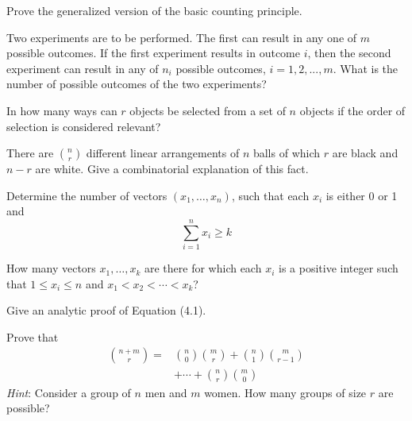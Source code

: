 \documentclass[12pt]{article}
\newenvironment{problem}[2][Problem]{\begin{trivlist}
\item[\hskip \labelsep {\bfseries #1}\hskip \labelsep {\bfseries #2.}]}{\end{trivlist}}
\begin{document}
\newpage
\begin{problem}{1.T.1}
Prove the generalized version of the basic counting principle.
\end{problem}


\begin{problem}{1.T.2}
Two experiments are to be performed. The first can result in any one of $m$ possible outcomes. If the first experiment results in outcome $i$, then the second experiment can result in any of $n_i$ possible outcomes, $i = 1,2,...,m$. What is the number of possible outcomes of the two experiments?
\end{problem}


\begin{problem}{  1.T.3 }
In how many ways can $r$ objects be selected from a set of $n$ objects if the order of selection is considered relevant?
\end{problem}


\begin{problem}{ 1.T.4 }
There are ${n \choose r}$ different linear arrangements of $n$ balls of which $r$ are black and $n-r$ are white. Give a combinatorial explanation of this fact.
\end{problem}


\begin{problem}{  1.T.5 }
Determine the number of vectors $\left(x_1,\ldots,x_n\right)$, such that each $x_i$ is either 0 or 1 and \[ \sum_{i=1}^n x_i \geq k\]
\end{problem}


\begin{problem}{  1.T.6 }
How many vectors $x_1,\ldots,x_k$ are there for which each $x_i$ is a positive integer such that $1\leq x_i \leq n$ and $x_1 < x_2 < \cdots < x_k$?
\end{problem}



\begin{problem}{   1.T.7}
Give an analytic proof of Equation (4.1).
\end{problem}




\begin{problem}{  1.T.8 }
Prove that
\begin{equation}
\begin{split}
{n+m \choose r} = & {n\choose 0}{m \choose r} + {n \choose 1}{m\choose r-1} \\ 
& + \cdots + {n \choose r}{m \choose 0}
\end{split}
\end{equation}
\textit{Hint}: Consider a group of $n$ men and $m$ women. How many groups of size $r$ are possible?
\end{problem}
\end{document}
